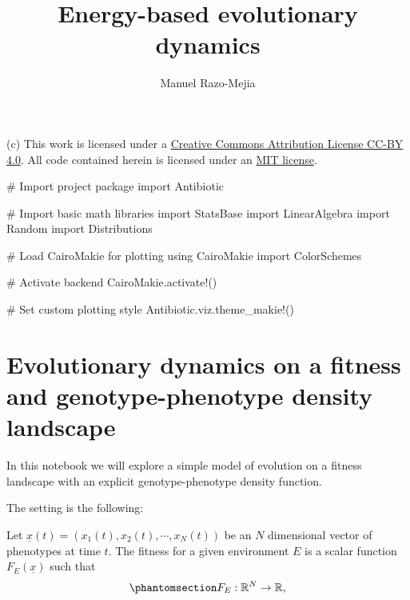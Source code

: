\documentclass[
]{scrartcl}
\title{Energy-based evolutionary dynamics}
\author[1]{Manuel Razo-Mejia}
\affil[1]{Department of Biology, Stanford University}
\date{}
\newenvironment{Shaded}{\begin{snugshade}}{\end{snugshade}}
\newcommand{\BuiltInTok}[1]{\textcolor[rgb]{0.00,0.23,0.31}{#1}}
\newcommand{\CommentTok}[1]{\textcolor[rgb]{0.37,0.37,0.37}{#1}}
\newcommand{\FunctionTok}[1]{\textcolor[rgb]{0.28,0.35,0.67}{#1}}
\newcommand{\ImportTok}[1]{\textcolor[rgb]{0.00,0.46,0.62}{#1}}
\newcommand{\NormalTok}[1]{\textcolor[rgb]{0.00,0.23,0.31}{#1}}
\begin{document}
\linenumbers
\maketitle
(c) This work is licensed under a
\href{https://creativecommons.org/licenses/by/4.0/}{Creative Commons
Attribution License CC-BY 4.0}. All code contained herein is licensed
under an \href{https://opensource.org/licenses/MIT}{MIT license}.

\begin{Shaded}
\begin{Highlighting}[]
\CommentTok{\# Import project package}
\ImportTok{import} \BuiltInTok{Antibiotic}

\CommentTok{\# Import basic math libraries}
\ImportTok{import} \BuiltInTok{StatsBase}
\ImportTok{import} \BuiltInTok{LinearAlgebra}
\ImportTok{import} \BuiltInTok{Random}
\ImportTok{import} \BuiltInTok{Distributions}

\CommentTok{\# Load CairoMakie for plotting}
\ImportTok{using} \BuiltInTok{CairoMakie}
\ImportTok{import} \BuiltInTok{ColorSchemes}

\CommentTok{\# Activate backend}
\NormalTok{CairoMakie.}\FunctionTok{activate!}\NormalTok{()}

\CommentTok{\# Set custom plotting style}
\NormalTok{Antibiotic.viz.}\FunctionTok{theme\_makie!}\NormalTok{()}
\end{Highlighting}
\end{Shaded}

\section{Evolutionary dynamics on a fitness and genotype-phenotype
density
landscape}\label{evolutionary-dynamics-on-a-fitness-and-genotype-phenotype-density-landscape}

In this notebook we will explore a simple model of evolution on a
fitness landscape with an explicit genotype-phenotype density function.

The setting is the following:

Let \(\underline{x}(t) = (x_1(t), x_2(t), \cdots, x_N(t))\) be an \(N\)
dimensional vector of phenotypes at time \(t\). The fitness for a given
environment \(E\) is a scalar function \(F_E(\underline{x})\) such that
\begin{equation}\phantomsection\label{eq-fitness-landscape}{
F_E: \mathbb{R}^N \to \mathbb{R},
}\end{equation}
\end{document}
